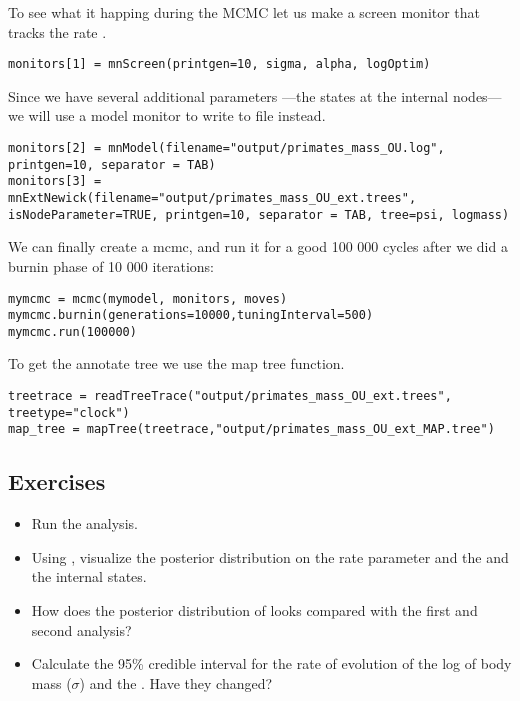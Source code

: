 To see what it happing during the MCMC let us make a screen monitor that tracks the rate .
{\tt \small \begin{snugshade*}
\begin{lstlisting}
monitors[1] = mnScreen(printgen=10, sigma, alpha, logOptim)
\end{lstlisting}
\end{snugshade*}}

Since we have several additional parameters ---the states at the internal nodes--- we will use a model monitor to write to file instead.
{\tt \small \begin{snugshade*}
\begin{lstlisting}
monitors[2] = mnModel(filename="output/primates_mass_OU.log", printgen=10, separator = TAB)
monitors[3] = mnExtNewick(filename="output/primates_mass_OU_ext.trees", isNodeParameter=TRUE, printgen=10, separator = TAB, tree=psi, logmass)
\end{lstlisting}
\end{snugshade*}}

We can finally create a mcmc, and run it for a good 100 000 cycles after we did a burnin phase of 10 000 iterations:
{\tt \small \begin{snugshade*}
\begin{lstlisting}
mymcmc = mcmc(mymodel, monitors, moves)
mymcmc.burnin(generations=10000,tuningInterval=500)
mymcmc.run(100000)
\end{lstlisting}
\end{snugshade*}}

To get the annotate tree we use the map tree function.

{\tt \small \begin{snugshade*}
\begin{lstlisting}
treetrace = readTreeTrace("output/primates_mass_OU_ext.trees", treetype="clock")
map_tree = mapTree(treetrace,"output/primates_mass_OU_ext_MAP.tree")
\end{lstlisting}
\end{snugshade*}}










\subsection*{Exercises}

\begin{itemize}
\item
Run the analysis.
\item
Using , visualize the posterior distribution on the rate parameter  and the  and the internal states.
\item 
How does the posterior distribution of  looks compared with the first and second analysis?
\item
Calculate the 95\% credible interval for the rate of evolution of the log of body mass ($\sigma$) and the . Have they changed?
\end{itemize}

